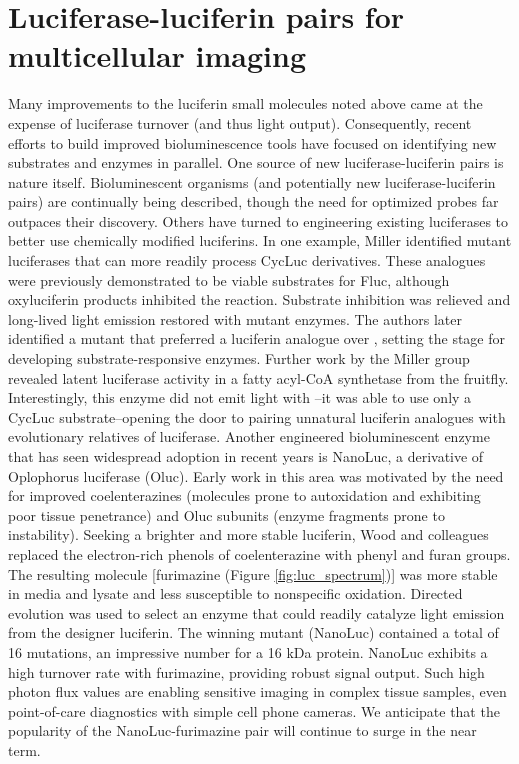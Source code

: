 \section{Luciferase-luciferin pairs for multicellular imaging}
Many improvements to the luciferin small molecules noted
above came at the expense of luciferase turnover (and thus light
output). Consequently, recent efforts to build improved
bioluminescence tools have focused on identifying new
substrates and enzymes in parallel. One source of new
luciferase-luciferin pairs is nature itself. Bioluminescent
organisms (and potentially new luciferase-luciferin pairs) are
continually being described,\cite{Purtov:2015hx} though the need for optimized
probes far outpaces their discovery. Others have turned to
engineering existing luciferases to better use chemically
modified luciferins. In one example, Miller identified mutant
luciferases that can more readily process CycLuc derivatives.
These analogues were previously demonstrated to be viable
substrates for Fluc, although oxyluciferin products inhibited the
reaction. Substrate inhibition was relieved and long-lived light
emission restored with mutant enzymes.\cite{Harwood:2011gl} The authors later
identified a mutant that preferred a luciferin analogue over \dluciferin{},
setting the stage for developing substrate-responsive
enzymes.\cite{RN97} Further work by the Miller group revealed latent
luciferase activity in a fatty acyl-CoA synthetase from the
fruitfly.\cite{RN165} Interestingly, this enzyme did not emit light with \dluciferin{}--it
was able to use only a CycLuc substrate--opening
the door to pairing unnatural luciferin analogues with
evolutionary relatives of luciferase.
Another engineered bioluminescent enzyme that has seen
widespread adoption in recent years is NanoLuc, a derivative of
Oplophorus luciferase (Oluc).\cite{Hall:2012cda} Early work in this area was
motivated by the need for improved coelenterazines (molecules
prone to autoxidation and exhibiting poor tissue penetrance)
and Oluc subunits (enzyme fragments prone to instability).
Seeking a brighter and more stable luciferin, Wood and
colleagues replaced the electron-rich phenols of coelenterazine
with phenyl and furan groups. The resulting molecule
[furimazine (Figure \ref{fig:luc_spectrum})] was more stable in media and lysate
and less susceptible to nonspecific oxidation. Directed
evolution was used to select an enzyme that could readily
catalyze light emission from the designer luciferin. The
winning mutant (NanoLuc) contained a total of 16
mutations, an impressive number for a 16 kDa protein.
NanoLuc exhibits a high turnover rate with furimazine,
providing robust signal output. Such high photon flux values
are enabling sensitive imaging in complex tissue samples, even
point-of-care diagnostics with simple cell phone cameras.\cite{Griss:2014de} We
anticipate that the popularity of the NanoLuc-furimazine pair
will continue to surge in the near term.

